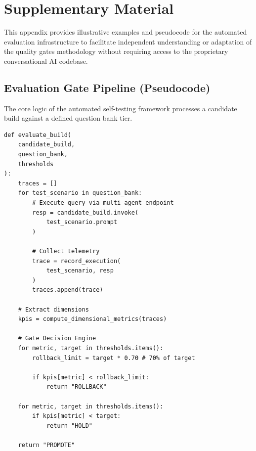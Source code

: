 \appendix
\section{Supplementary Material}
\label{sec:appendix}

This appendix provides illustrative examples and pseudocode for the automated evaluation infrastructure to facilitate independent understanding or adaptation of the quality gates methodology without requiring access to the proprietary conversational AI codebase.

\subsection{Evaluation Gate Pipeline (Pseudocode)}
The core logic of the automated self-testing framework processes a candidate build against a defined question bank tier.

\begin{algorithm}[ht]
\caption{Evaluation Gate Pipeline Decision Logic}
\label{alg:gate_pipeline}
{\footnotesize
\begin{verbatim}
def evaluate_build(
    candidate_build,
    question_bank,
    thresholds
):
    traces = []
    for test_scenario in question_bank:
        # Execute query via multi-agent endpoint
        resp = candidate_build.invoke(
            test_scenario.prompt
        )

        # Collect telemetry
        trace = record_execution(
            test_scenario, resp
        )
        traces.append(trace)

    # Extract dimensions
    kpis = compute_dimensional_metrics(traces)

    # Gate Decision Engine
    for metric, target in thresholds.items():
        rollback_limit = target * 0.70 # 70% of target

        if kpis[metric] < rollback_limit:
            return "ROLLBACK"

    for metric, target in thresholds.items():
        if kpis[metric] < target:
            return "HOLD"

    return "PROMOTE"
\end{verbatim}
}
\end{algorithm}

